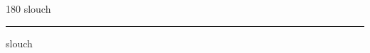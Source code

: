 
\begin{frame}
\begin{center}
\begin{turn}{180}
{\fontsize{2.5cm}{1em}\selectfont slouch}
\end{turn}
\vspace{1em}\par  
\hrule
\vspace{1em}\par  
{\fontsize{2.5cm}{1em}\selectfont slouch}
\end{center}
\end{frame}
